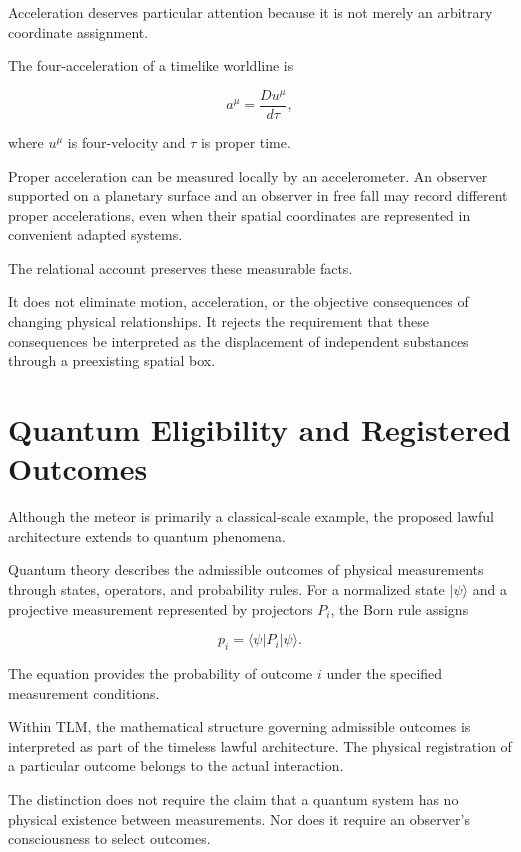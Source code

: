 \documentclass[12pt,onecolumn]{article}
\begin{document}
Acceleration deserves particular attention because it is not merely an arbitrary coordinate assignment.

The four-acceleration of a timelike worldline is

\begin{equation}
a^\mu=\frac{Du^\mu}{d\tau},
\end{equation}

where $u^\mu$ is four-velocity and $\tau$ is proper time.

Proper acceleration can be measured locally by an accelerometer. An observer supported on a planetary surface and an observer in free fall may record different proper accelerations, even when their spatial coordinates are represented in convenient adapted systems.

The relational account preserves these measurable facts.

It does not eliminate motion, acceleration, or the objective consequences of changing physical relationships. It rejects the requirement that these consequences be interpreted as the displacement of independent substances through a preexisting spatial box.

\section{Quantum Eligibility and Registered Outcomes}

Although the meteor is primarily a classical-scale example, the proposed lawful architecture extends to quantum phenomena.

Quantum theory describes the admissible outcomes of physical measurements through states, operators, and probability rules. For a normalized state $\lvert\psi\rangle$ and a projective measurement represented by projectors $P_i$, the Born rule assigns

\begin{equation}
p_i=\langle\psi\lvert P_i\rvert\psi\rangle.
\end{equation}

The equation provides the probability of outcome $i$ under the specified measurement conditions.

Within TLM, the mathematical structure governing admissible outcomes is interpreted as part of the timeless lawful architecture. The physical registration of a particular outcome belongs to the actual interaction.

The distinction does not require the claim that a quantum system has no physical existence between measurements. Nor does it require an observer's consciousness to select outcomes.
\end{document}
